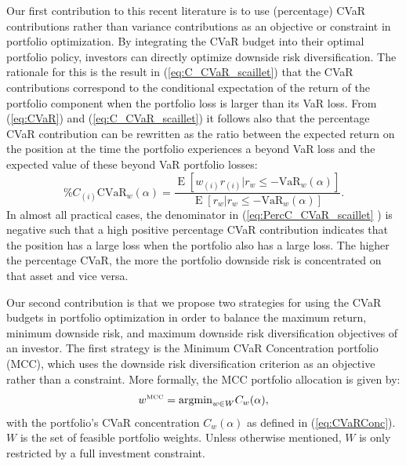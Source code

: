 \documentclass[12pt,a4paper]{article}
\DeclareMathOperator{\E}{\operatorname{E}}
\newcommand{\argmin}{{\operatorname{argmin}}}
\begin{document}
Our first contribution to this recent literature is to use (percentage) CVaR contributions rather than variance contributions as an objective or constraint in portfolio optimization. By integrating the CVaR budget into their optimal portfolio policy, investors can directly optimize downside risk diversification. The rationale for this is the result in (\ref{eq:C_CVaR_scaillet}) that the CVaR contributions correspond to the conditional expectation of the return of the portfolio component when the portfolio loss is larger than its VaR loss. From (\ref{eq:CVaR}) and (\ref{eq:C_CVaR_scaillet}) it follows also that the percentage CVaR contribution can be rewritten as the ratio between the expected return on the position at the time the portfolio experiences a beyond VaR loss and the expected value of these beyond VaR portfolio losses:
 \begin{equation} \%C_{(i)}\mbox{CVaR}_w(\alpha) = \frac{ \E[w_{(i)}r_{(i)} | r_w \leq -\mbox{VaR}_w(\alpha)] }{\E[r_w | r_w \leq -\mbox{VaR}_w(\alpha)]}. \label{eq:PercC_CVaR_scaillet} \end{equation}
In almost all practical cases, the denominator in (\ref{eq:PercC_CVaR_scaillet} ) is negative such that a high positive percentage CVaR contribution indicates that the position has a large loss when the portfolio also has a large loss. The higher the percentage CVaR, the more the portfolio downside risk is concentrated on that asset and vice versa.

 Our second contribution is that we propose two strategies for using the CVaR budgets in portfolio optimization in order to balance the maximum return, minimum downside risk, and maximum downside risk diversification objectives of an investor. The first strategy is the Minimum CVaR Concentration portfolio (MCC), which uses the downside risk diversification criterion as an objective rather than a constraint. More formally, the MCC portfolio allocation is given by:
\begin{equation}  w^{\mbox{\tiny MCC}} = \argmin_{w \in W} C_w(\alpha) , \label{eq:MCCportfolio} \end{equation}
with the portfolio's CVaR concentration $C_w(\alpha)$ as defined in (\ref{eq:CVaRConc}). $W$ is the set of feasible portfolio weights. 
Unless otherwise mentioned, $W$ is only restricted by a full investment constraint. 
\end{document}
